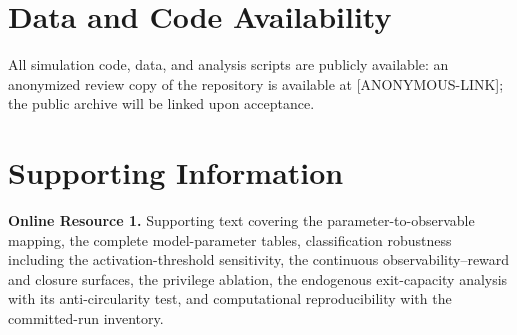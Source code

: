 \documentclass[12pt]{article}
\begin{document}
\section*{Data and Code Availability}

All simulation code, data, and analysis scripts are publicly available: an anonymized review copy of the repository is available at [ANONYMOUS-LINK]; the public archive will be linked upon acceptance.

\section*{Supporting Information}

\noindent\textbf{Online Resource 1.} Supporting text covering the parameter-to-observable mapping, the complete model-parameter tables, classification robustness including the activation-threshold sensitivity, the continuous observability--reward and closure surfaces, the privilege ablation, the endogenous exit-capacity analysis with its anti-circularity test, and computational reproducibility with the committed-run inventory.
\end{document}
